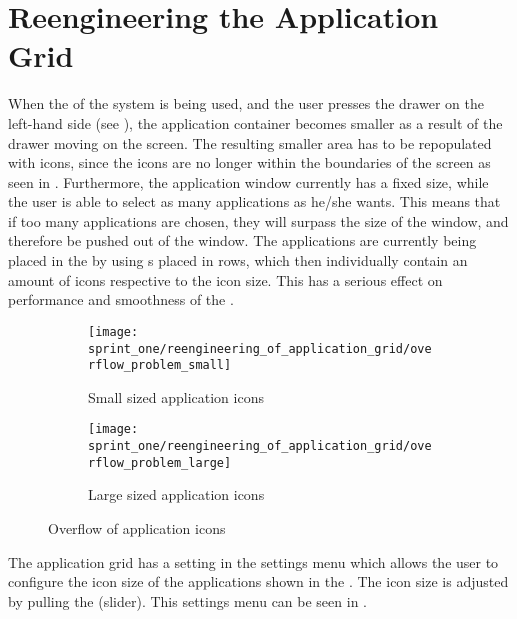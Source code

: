 
\section{Reengineering the Application Grid}
\label{sec:reengineering_of_application_grid}

When the \launcher of the \giraf system is being used, and the user presses the drawer on the left-hand side (see ), the application container becomes smaller as a result of the drawer moving on the screen. The resulting smaller area has to be repopulated with icons, since the icons are no longer within the boundaries of the screen as seen in . Furthermore, the application window currently has a fixed size, while the user is able to select as many applications as he/she wants. This means that if too many applications are chosen, they will surpass the size of the window, and therefore be pushed out of the window. The applications are currently being placed in the \launcher by using s placed in rows, which then individually contain an amount of icons respective to the icon size. This has a serious effect on performance and smoothness of the \launcher. 

\begin{figure}[!htbp]
    \centering
    \begin{subfigure}[t]{0.3\textwidth}
        \centering
        \texttt{[image: sprint\_one/reengineering\_of\_application\_grid/overflow\_problem\_small]}
        \caption{Small sized application icons}
        \label{fig:overflow_problem_small}
    \end{subfigure}
    \hspace{5em} 
    \begin{subfigure}[t]{0.3\textwidth}
        \centering
        \texttt{[image: sprint\_one/reengineering\_of\_application\_grid/overflow\_problem\_large]}
        \caption{Large sized application icons}
        \label{fig:overflow_problem_large}
    \end{subfigure}
    
    \caption{Overflow of application icons}
    \label{fig:overflow_problem}
\end{figure}

The application grid has a setting in the settings menu which allows the user to configure the icon size of the applications shown in the \launcher. The icon size is adjusted by pulling the  (slider). This settings menu can be seen in .

